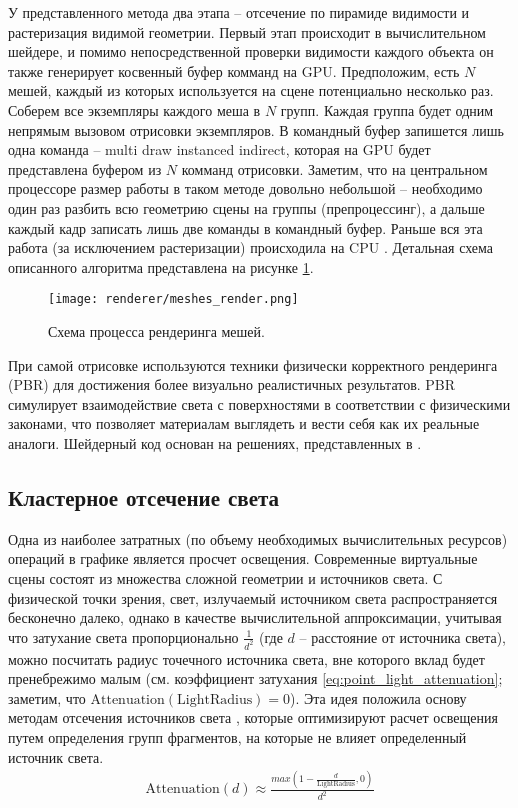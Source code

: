 У представленного метода два этапа -- отсечение по пирамиде видимости и растеризация видимой геометрии. Первый этап происходит в вычислительном шейдере, и помимо непосредственной проверки видимости каждого объекта он также генерирует косвенный буфер комманд на GPU. Предположим, есть $N$ мешей, каждый из которых используется на сцене потенциально несколько раз. Соберем все экземпляры каждого меша в $N$ групп. Каждая группа будет одним непрямым вызовом отрисовки экземпляров. В командный буфер запишется лишь одна команда -- multi draw instanced indirect, которая на GPU будет представлена буфером из $N$ комманд отрисовки. Заметим, что на центральном процессоре размер работы в таком методе довольно небольшой -- необходимо один раз разбить всю геометрию сцены на группы (препроцессинг), а дальше каждый кадр записать лишь две команды в командный буфер. Раньше вся эта работа (за исключением растеризации) происходила на CPU \cite{frustum_culling_2000}. Детальная схема описанного алгоритма представлена на рисунке \ref{fig:meshes_render}.

\begin{figure}[h]
    \centering
    \texttt{[image: renderer/meshes\_render.png]}
    \caption{Схема процесса рендеринга мешей.}
    \label{fig:meshes_render}
\end{figure}

При самой отрисовке используются техники физически корректного рендеринга (PBR) для достижения более визуально реалистичных результатов. PBR симулирует взаимодействие света с поверхностями в соответствии с физическими законами, что позволяет материалам выглядеть и вести себя как их реальные аналоги. Шейдерный код основан на решениях, представленных в \cite{pbr_book2016}.

\subsection{Кластерное отсечение света}
Одна из наиболее затратных (по объему необходимых вычислительных ресурсов) операций в графике является просчет освещения. Современные виртуальные сцены состоят из множества сложной геометрии и источников света. С физической точки зрения, свет, излучаемый источником света распространяется бесконечно далеко, однако в качестве вычислительной аппроксимации, учитывая что затухание света пропорционально $\frac{1}{d^2}$ (где $d$ -- расстояние от источника света), можно посчитать радиус точечного источника света, вне которого вклад будет пренебрежимо малым (см. коэффициент затухания \ref{eq:point_light_attenuation}; заметим, что $\text{Attenuation}(\text{LightRadius}) = 0$). Эта идея положила основу методам отсечения источников света \cite{Harada2012ForwardBD}, которые оптимизируют расчет освещения путем определения групп фрагментов, на которые не влияет определенный источник света.
\begin{align}
    \text{Attenuation}(d) \approx \frac{max \left(1 - \frac{d}{\text{LightRadius}}, 0\right) }{d^2}
    \label{eq:point_light_attenuation}
\end{align}

